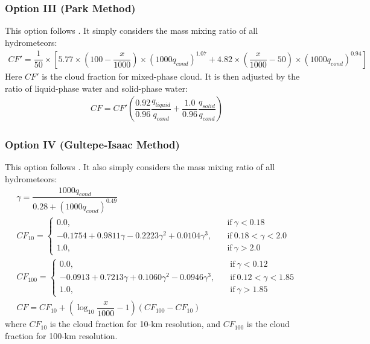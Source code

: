 \documentclass[letterpaper,titlepage,10pt]{article}
\numberwithin{equation}{section}
\begin{document}

\subsubsection*{Option III (Park Method)}

This option follows \citet{park2016arev}. It simply considers the mass mixing ratio of all hydrometeors:
\begin{gather}
	CF' = \dfrac{1}{50} \times \left[5.77 \times \left(100 - \dfrac{x}{1000} \right) \times \left(1000 q_{cond} \right)^{1.07} + 4.82 \times \left(\dfrac{x}{1000} - 50 \right) \times \left(1000 q_{cond} \right)^{0.94} \right]
\end{gather}
Here $CF'$ is the cloud fraction for mixed-phase cloud. It is then adjusted by the ratio of liquid-phase water and solid-phase water:
\begin{gather}
	CF = CF' \left(\dfrac{0.92}{0.96} \dfrac{q_{liquid}}{q_{cond}} + \dfrac{1.0}{0.96} \dfrac {q_{solid}}{q_{cond}} \right)
\end{gather}


\subsubsection*{Option IV (Gultepe-Isaac Method)}

This option follows \citet{gultepe2007clou}. It also simply considers the mass mixing ratio of all hydrometeors:
\begin{align}
	\gamma = \dfrac{1000 q_{cond}}{0.28 + \left(1000 q_{cond} \right)^{0.49}} \\
	CF_{10} = 
	\begin{cases}
		0.0, & \quad \text{if} \ \gamma < 0.18 \\
		- 0.1754 + 0.9811 \gamma - 0.2223 \gamma^2 + 0.0104 \gamma^3, & \quad \text{if} \ 0.18 < \gamma < 2.0 \\
		1.0, & \quad \text{if} \ \gamma > 2.0
	\end{cases} \\
	CF_{100} = 
	\begin{cases}
		0.0, & \quad \text{if} \ \gamma < 0.12 \\
		- 0.0913 + 0.7213 \gamma + 0.1060 \gamma^2 - 0.0946 \gamma^3, & \quad \text{if} \ 0.12 < \gamma < 1.85 \\
		1.0, & \quad \text{if} \ \gamma > 1.85
	\end{cases} \\
	CF = CF_{10} + \left(\log_{10} \dfrac{x}{1000} - 1 \right) \left(CF_{100} - CF_{10} \right)
\end{align}
where $CF_{10}$ is the cloud fraction for 10-km resolution, and $CF_{100}$ is the cloud fraction for 100-km resolution. 
\end{document}
